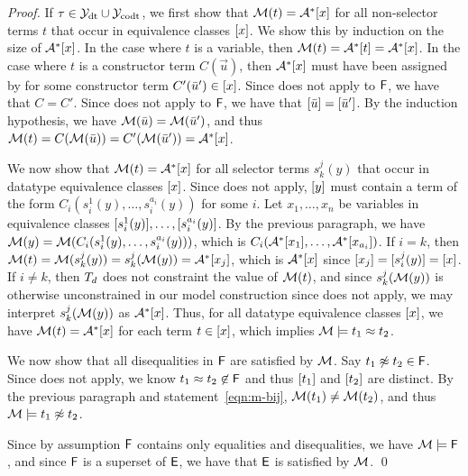 \begin{proof}
If $\tau \in \mathcal{Y}_{\mathrm{dt}} \cup \mathcal{Y}_{\mathrm{codt}}$,
we first show that $\mathcal{M}( t ) = \mathcal{A}^\ast [ x ]$ for all non-selector terms $t$ that occur in equivalence classes $[ x ]$.
We show this by induction on the size of $\mathcal{A}^\ast [ x ]$.
In the case where $t$ is a variable, then $\mathcal{M}( t ) = \mathcal{A}^\ast [  t  ] = \mathcal{A}^\ast [  x  ]$.
In the case where $t$ is a constructor term $C( \vec u )$, 
then $\mathcal{A}^\ast [ x ]$ must have been assigned by  for some constructor term $C'( \bar u' ) \in [ x ]$.
Since  does not apply to $\mathsf{F}$, we have that $C = C'$.
Since  does not apply to $\mathsf{F}$, we have that $[ \bar u ] = [ \bar u' ]$.
By the induction hypothesis, we have $\mathcal{M}( \bar u ) = \mathcal{M}( \bar u' )$, and thus $\mathcal{M}( t ) = C( \mathcal{M}( \bar u ) ) = C'( \mathcal{M}( \bar u ' ) ) = \mathcal{A}^\ast [  x  ]$.

We now show that $\mathcal{M}( t ) = \mathcal{A}^\ast [ x ]$ for all selector terms $s^j_k( y )$ that occur in datatype equivalence classes $[ x ]$.
Since  does not apply, 
$[ y ]$ must contain a term of the form $C_i( s^1_i( y ), \ldots, s^{a_i}_i( y ) )$ for some $i$.
Let $x_1, \ldots, x_n$ be variables in equivalence classes $[ s^1_i( y ) ], \ldots, [ s^{a_i}_i( y ) ]$.
By the previous paragraph, we have $\mathcal{M}( y ) = \mathcal{M}( C_i( s^1_i( y ), \ldots, s^{a_i}_i( y ) ) )$,
which is $C_i( \mathcal{A}^\ast [  x_1  ], \ldots, \mathcal{A}^\ast [  x_{a_i}  ] )$.
If $i = k$, then $\mathcal{M}( t ) = \mathcal{M}( s^j_k( y ) ) = s^j_k( \mathcal{M}( y ) ) = \mathcal{A}^\ast [ x_j ]$, which is $\mathcal{A}^\ast [  x  ]$ since $[ x_j ] = [ s^j_i( y ) ] = [ x ]$.
If $i \neq k$, then $T_{d}$ does not constraint the value of $\mathcal{M}( t )$,
and since $s^j_k( \mathcal{M}( y ) )$ is otherwise unconstrained in our model construction since  does not apply, 
we may interpret $s^j_k( \mathcal{M}( y ) )$ as $\mathcal{A}^\ast [  x  ]$. 
Thus, for all datatype equivalence classes $[ x ]$, we have $\mathcal{M}( t ) = \mathcal{A}^\ast [ x ]$ for each term $t \in [ x ]$, which implies $\mathcal{M} \models t_1 \approx t_2$.

We now show that all disequalities in $\mathsf{F}$ are satisfied by $\mathcal{M}$.
Say $t_1 \not\approx t_2 \in \mathsf{F}$.
Since  does not apply, we know $t_1 \approx t_2 \not\in \mathsf{F}$ and thus $[ t_1 ]$ and $[ t_2 ]$ are distinct.
By the previous paragraph and statement~\ref{eqn:m-bij}, $\mathcal{M}( t_1 ) \neq \mathcal{M}( t_2 )$, and thus $\mathcal{M} \models t_1 \not\approx t_2$.

Since by assumption $\mathsf{F}$ contains only equalities and disequalities, we have $\mathcal{M} \models \mathsf{F}$,
and since $\mathsf{F}$ is a superset of $\mathsf{E}$, we have that $\mathsf{E}$ is satisfied by $\mathcal{M}$.
\qed
\end{proof}

